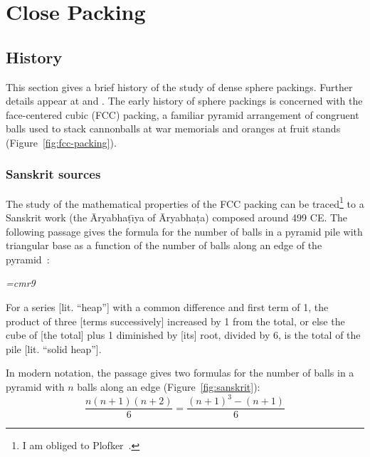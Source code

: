 

\chapter{Close Packing}\label{sec:close}

\section{History}\label{sec:history}

This section gives a brief history of the study of dense sphere
packings.  Further details appear at \cite{Szpiro} and
\cite{Hales:2006:overview}.
The early history of sphere packings is concerned with the
face-centered cubic (FCC) packing, a familiar pyramid arrangement
of congruent balls used to stack cannonballs at war memorials and
oranges at fruit stands (Figure~\ref{fig:fcc-packing}).

\figDHQRILO %


\subsection{Sanskrit sources}



The study of the mathematical properties of the FCC
packing can be traced\footnote{I am obliged to Plofker~\cite{Plo00}.} to a Sanskrit work (the \=Aryabha\d t\={\i}ya
 of \=Aryabha\d ta) composed around 499 CE.  The following passage gives
the formula for the number of balls in a pyramid pile with triangular base as
a function of the number of balls along an edge of the pyramid~\cite{Ary}:


\bigskip

{\narrower\it\font\ninerm=cmr9

For a series [lit. ``heap''] with a common difference and
  first term of 1, the product of three [terms successively] increased
  by 1 from the total, or else the cube of [the total] plus 1
  diminished by [its] root, divided by 6, is the total of the pile
  [lit. ``solid heap''].  

}

\bigskip

 In modern notation, the passage gives two formulas for the number of
 balls in a pyramid with $n$ balls along an edge (Figure~\ref{fig:sanskrit}):
\begin{equation}\label{eqn:sanskrit}
\dfrac{n(n+1)(n+2)}{6} =  \dfrac{(n+1)^3 - (n+1)}{6}
\end{equation}

